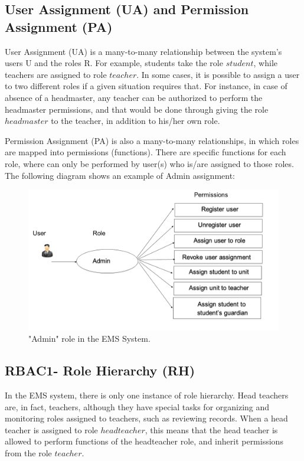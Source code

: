 \subsection{User Assignment (UA) and Permission Assignment (PA)}
User Assignment (UA) is a many-to-many relationship between the system’s users U and the roles R.  For example, students take the role $student$, while teachers are assigned to role $teacher$.  In some cases, it is possible to assign a user to two different roles if a given situation requires that.  For instance, in case of absence of a headmaster, any teacher can be authorized to perform the headmaster permissions, and that would be done through giving the role $headmaster$ to the teacher, in addition to his/her own role.

Permission Assignment (PA) is also a many-to-many relationships, in which roles are mapped into permissions (functions).  There are specific functions for each role, where can only be performed by user(s) who is/are assigned to those roles.  The following diagram shows an example of Admin assignment:

\begin{figure}[bht]
\centering
\includegraphics[scale=0.26]{addAdmin.png}
\caption{"Admin" role in the EMS System.}
\label{fig:permstud}
\end{figure}


\subsection{RBAC1- Role Hierarchy (RH)}

In the EMS system, there is only one instance of role hierarchy.  Head teachers are, in fact, teachers, although they have special tasks for organizing and monitoring roles assigned to teachers, such as reviewing records.  When a head teacher is assigned to role $headteacher$, this means that the head teacher is allowed to perform functions of the headteacher role, and inherit permissions from the role $teacher$.

